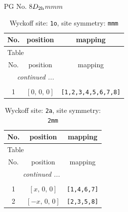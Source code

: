 \documentclass[fleqn,8pt]{jsarticle}
\begin{document}
\setcounter{MaxMatrixCols}{32}

\renewcommand{\tablename}{Table~}
\renewcommand{\figurename}{Figure~}
\begin{center}
\LARGE
PG No. 8\quad$D_{\rm 2h}$\quad$mmm$\quad[ orthorhombic ]
\end{center}
\renewcommand{\arraystretch}{1.2}
\begin{longtable}{ccc}
\caption{Wyckoff site: {\tt 1o}, site symmetry: {\tt mmm}}
 \\
 \hline \hline
No. & position & mapping \\ \hline \endfirsthead

\multicolumn{2}{l}{\tablename\ \thetable{}} \\
 \hline \hline
No. & position & mapping \\ \hline \endhead

 \hline \hline
\multicolumn{2}{r}{\footnotesize\it continued ...} \\ \endfoot

 \hline \hline
\multicolumn{2}{r}{} \\ \endlastfoot

1 & $\left[ 0,\, 0,\, 0 \right]$ & {\tt [1,2,3,4,5,6,7,8]} \\
\end{longtable}
\renewcommand{\arraystretch}{1.2}
\begin{longtable}{ccc}
\caption{Wyckoff site: {\tt 2a}, site symmetry: {\tt 2mm}}
 \\
 \hline \hline
No. & position & mapping \\ \hline \endfirsthead

\multicolumn{2}{l}{\tablename\ \thetable{}} \\
 \hline \hline
No. & position & mapping \\ \hline \endhead

 \hline \hline
\multicolumn{2}{r}{\footnotesize\it continued ...} \\ \endfoot

 \hline \hline
\multicolumn{2}{r}{} \\ \endlastfoot

1 & $\left[ x,\, 0,\, 0 \right]$ & {\tt [1,4,6,7]} \\ \hline
2 & $\left[ - x,\, 0,\, 0 \right]$ & {\tt [2,3,5,8]} \\
\end{longtable}
\renewcommand{\arraystretch}{1.2}
\end{document}
